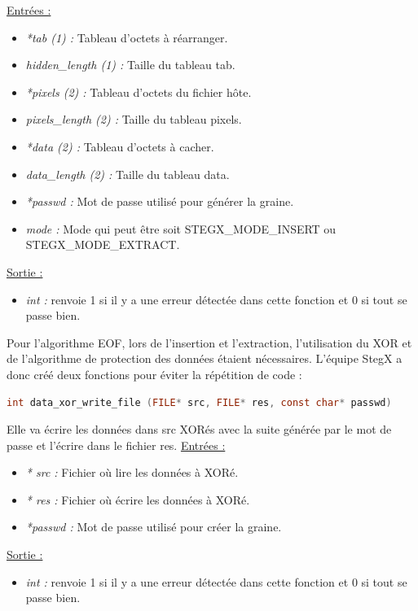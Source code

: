 \documentclass[11pt]{article}
\begin{document}
\underline{Entrées :}
\begin{itemize}
\item \textit{*tab (1) :} Tableau d'octets à réarranger. 
\item \textit{hidden\_length (1) :} Taille du tableau tab.
\item \textit{*pixels (2) :} Tableau d'octets du fichier hôte. 
\item \textit{pixels\_length (2) :} Taille du tableau pixels. 
\item \textit{*data (2) :} Tableau d'octets à cacher. 
\item \textit{data\_length (2) :} Taille du tableau data. 
\item \textit{*passwd :} Mot de passe utilisé pour générer la graine. 
\item \textit{mode :} Mode qui peut être soit STEGX\_MODE\_INSERT ou 
STEGX\_MODE\_EXTRACT. 
\end{itemize}
\underline{Sortie :} 
\begin{itemize}
\item \textit{int :} renvoie 1 si il y a une erreur détectée dans cette 
fonction et 0 si tout se passe bien.  
\newline 
\end{itemize}

Pour l'algorithme EOF, lors de l'insertion et l'extraction, l'utilisation 
du XOR et de l'algorithme de protection des données étaient nécessaires. 
L'équipe StegX a donc créé deux fonctions pour éviter la répétition de code : 

\begin{lstlisting}[language=c]
int data_xor_write_file (FILE* src, FILE* res, const char* passwd)
\end{lstlisting}

Elle va écrire les données dans src XORés avec la suite générée par le mot 
de passe et l'écrire dans le fichier res. 
\newline
\underline{Entrées :}
\begin{itemize}
\item \textit{* src :} Fichier où lire les données à XORé. 
\item \textit{* res :} Fichier où écrire les données à XORé. 
\item \textit{*passwd :} Mot de passe utilisé pour créer la graine. 
\end{itemize}
\underline{Sortie :} 
\begin{itemize}
\item \textit{int :} renvoie 1 si il y a une erreur détectée dans cette 
fonction et 0 si tout se passe bien. 
\newline 
\end{itemize}
\end{document}
